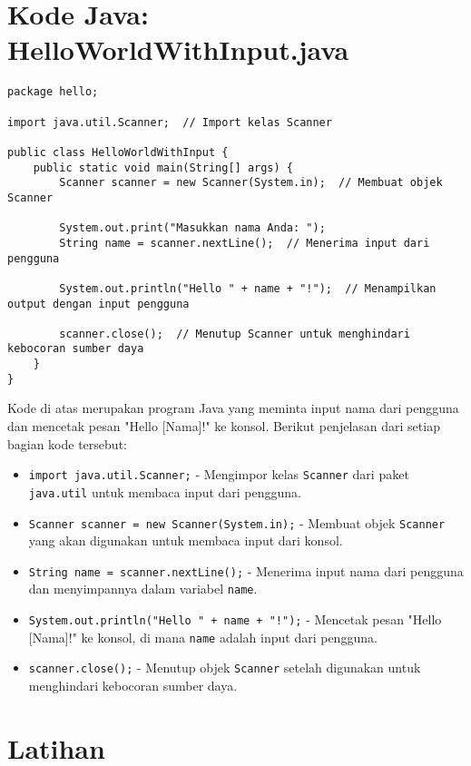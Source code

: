\section{Kode Java: HelloWorldWithInput.java}

\begin{lstlisting}[style=JavaStyle, caption={Kode Java: HelloWorldWithInput.java}]
package hello;

import java.util.Scanner;  // Import kelas Scanner

public class HelloWorldWithInput {
	public static void main(String[] args) {
		Scanner scanner = new Scanner(System.in);  // Membuat objek Scanner
		
		System.out.print("Masukkan nama Anda: ");
		String name = scanner.nextLine();  // Menerima input dari pengguna
		
		System.out.println("Hello " + name + "!");  // Menampilkan output dengan input pengguna
		
		scanner.close();  // Menutup Scanner untuk menghindari kebocoran sumber daya
	}
}
\end{lstlisting}

Kode di atas merupakan program Java yang meminta input nama dari pengguna dan mencetak pesan "Hello [Nama]!" ke konsol. Berikut penjelasan dari setiap bagian kode tersebut:

\begin{itemize}
\item \texttt{import java.util.Scanner;} - Mengimpor kelas \texttt{Scanner} dari paket \texttt{java.util} untuk membaca input dari pengguna.
\item \texttt{Scanner scanner = new Scanner(System.in);} - Membuat objek \texttt{Scanner} yang akan digunakan untuk membaca input dari konsol.
\item \texttt{String name = scanner.nextLine();} - Menerima input nama dari pengguna dan menyimpannya dalam variabel \texttt{name}.
\item \texttt{System.out.println("Hello " + name + "!");} - Mencetak pesan "Hello [Nama]!" ke konsol, di mana \texttt{name} adalah input dari pengguna.
\item \texttt{scanner.close();} - Menutup objek \texttt{Scanner} setelah digunakan untuk menghindari kebocoran sumber daya.
\end{itemize}


\section{Latihan}

